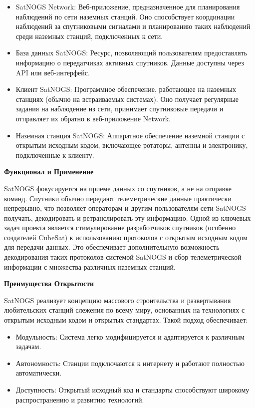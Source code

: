 ﻿\documentclass[14pt, a4paper]{extreport}
\begin{document}
\begin{itemize}[label=\textbullet]
	\item	SatNOGS Network: Веб-приложение, предназначенное для планирования наблюдений по сети наземных станций. Оно способствует координации наблюдений за спутниковыми сигналами и планированию таких наблюдений среди наземных станций, подключенных к сети.
	\item	База данных SatNOGS: Ресурс, позволяющий пользователям предоставлять информацию о передатчиках активных спутников. Данные доступны через API или веб-интерфейс.
	\item	Клиент SatNOGS: Программное обеспечение, работающее на наземных станциях (обычно на встраиваемых системах). Оно получает регулярные задания на наблюдение из сети, принимает спутниковые передачи и отправляет их обратно в веб-приложение Network.
	\item	Наземная станция SatNOGS: Аппаратное обеспечение наземной станции с открытым исходным кодом, включающее ротаторы, антенны и электронику, подключенные к клиенту.
\end{itemize}

\textbf{Функционал и Применение}

SatNOGS фокусируется на приеме данных со спутников, а не на отправке команд. Спутники обычно передают телеметрические данные практически непрерывно, что позволяет операторам и другим пользователям сети SatNOGS получать, декодировать и ретранслировать эту информацию.
Одной из ключевых задач проекта является стимулирование разработчиков спутников (особенно создателей CubeSat) к использованию протоколов с открытым исходным кодом для передачи данных. Это обеспечивает дополнительную возможность декодирования таких протоколов системой SatNOGS и сбор телеметрической информации с множества различных наземных станций.

\textbf{Преимущества Открытости}

SatNOGS реализует концепцию массового строительства и развертывания любительских станций слежения по всему миру, основанных на технологиях с открытым исходным кодом и открытых стандартах. Такой подход обеспечивает:

\begin{itemize}[label=\textbullet]
	\item	Модульность: Система легко модифицируется и адаптируется к различным задачам.
	\item	Автономность: Станции подключаются к интернету и работают полностью автоматически.
	\item	Доступность: Открытый исходный код и стандарты способствуют широкому распространению и развитию технологий.
\end{itemize}
\end{document}
